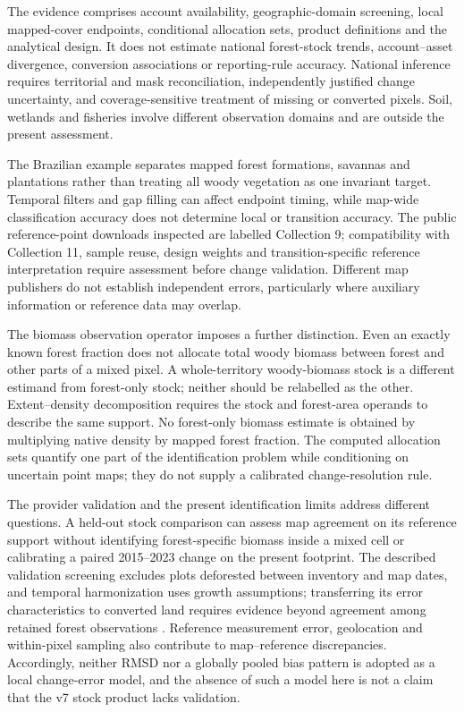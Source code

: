 \documentclass[11pt,a4paper]{article}
\begin{document}
The evidence comprises account availability, geographic-domain screening, local mapped-cover endpoints, conditional allocation sets, product definitions and the analytical design. It does not estimate national forest-stock trends, account--asset divergence, conversion associations or reporting-rule accuracy. National inference requires territorial and mask reconciliation, independently justified change uncertainty, and coverage-sensitive treatment of missing or converted pixels. Soil, wetlands and fisheries involve different observation domains and are outside the present assessment.

The Brazilian example separates mapped forest formations, savannas and plantations rather than treating all woody vegetation as one invariant target. Temporal filters and gap filling can affect endpoint timing, while map-wide classification accuracy does not determine local or transition accuracy. The public reference-point downloads inspected are labelled Collection 9; compatibility with Collection 11, sample reuse, design weights and transition-specific reference interpretation require assessment before change validation. Different map publishers do not establish independent errors, particularly where auxiliary information or reference data may overlap.

The biomass observation operator imposes a further distinction. Even an exactly known forest fraction does not allocate total woody biomass between forest and other parts of a mixed pixel. A whole-territory woody-biomass stock is a different estimand from forest-only stock; neither should be relabelled as the other. Extent--density decomposition requires the stock and forest-area operands to describe the same support. No forest-only biomass estimate is obtained by multiplying native density by mapped forest fraction. The computed allocation sets quantify one part of the identification problem while conditioning on uncertain point maps; they do not supply a calibrated change-resolution rule.

The provider validation and the present identification limits address different questions. A held-out stock comparison can assess map agreement on its reference support without identifying forest-specific biomass inside a mixed cell or calibrating a paired 2015--2023 change on the present footprint. The described validation screening excludes plots deforested between inventory and map dates, and temporal harmonization uses growth assumptions; transferring its error characteristics to converted land requires evidence beyond agreement among retained forest observations \citep[pp.~13, 18--19]{PVIR2026}. Reference measurement error, geolocation and within-pixel sampling also contribute to map--reference discrepancies. Accordingly, neither RMSD nor a globally pooled bias pattern is adopted as a local change-error model, and the absence of such a model here is not a claim that the v7 stock product lacks validation.
\end{document}
